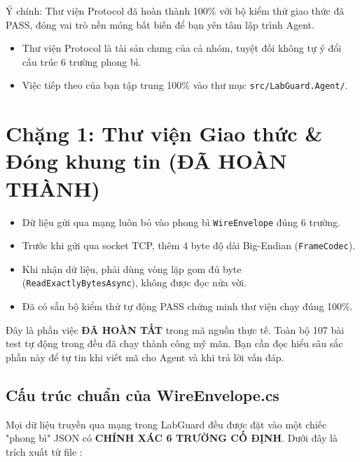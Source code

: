 \documentclass[12pt,a4paper]{article}
\begin{document}
Ý chính: Thư viện Protocol đã hoàn thành 100\% với bộ kiểm thử giao thức đã PASS, đóng vai trò nền móng bất biến để bạn yên tâm lập trình Agent.

\begin{takeawaybox}
\begin{itemize}[leftmargin=1.5em, itemsep=1pt]
  \item Thư viện Protocol là tài sản chung của cả nhóm, tuyệt đối không tự ý đổi cấu trúc 6 trường phong bì.
  \item Việc tiếp theo của bạn tập trung 100\% vào thư mục \texttt{src/LabGuard.Agent/}.
\end{itemize}
\end{takeawaybox}

\section[Chặng 1: Thư viện Giao thức (ĐÃ HOÀN THÀNH)]{Chặng 1: Thư viện Giao thức \& Đóng khung tin (ĐÃ HOÀN THÀNH)}

\begin{summarybox}
\begin{itemize}[leftmargin=1.5em, itemsep=1pt]
  \item Dữ liệu gửi qua mạng luôn bỏ vào phong bì \texttt{WireEnvelope} đúng 6 trường.
  \item Trước khi gửi qua socket TCP, thêm 4 byte độ dài Big-Endian (\texttt{FrameCodec}).
  \item Khi nhận dữ liệu, phải dùng vòng lặp gom đủ byte (\texttt{ReadExactlyBytesAsync}), không được đọc nửa vời.
  \item Đã có sẵn bộ kiểm thử tự động PASS chứng minh thư viện chạy đúng 100\%.
\end{itemize}
\end{summarybox}

\begin{importantbox}
Đây là phần việc \textbf{ĐÃ HOÀN TẤT} trong mã nguồn thực tế. Toàn bộ 107 bài test tự động trong  đều đã chạy thành công mỹ mãn. Bạn cần đọc hiểu sâu sắc phần này để tự tin khi viết mã cho Agent và khi trả lời vấn đáp.
\end{importantbox}

\subsection{Cấu trúc chuẩn của WireEnvelope.cs}
Mọi dữ liệu truyền qua mạng trong LabGuard đều được đặt vào một chiếc "phong bì" JSON có \textbf{CHÍNH XÁC 6 TRƯỜNG CỐ ĐỊNH}. Dưới đây là trích xuất từ file :
\end{document}
